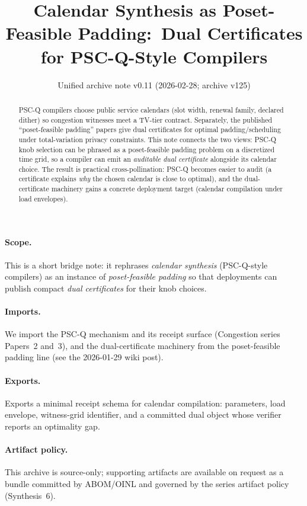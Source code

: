 \documentclass[11pt]{article}
\title{Calendar Synthesis as Poset-Feasible Padding:\ Dual Certificates for PSC-Q-Style Compilers}
\author{}
\date{Unified archive note v0.11 (2026-02-28; archive v125)}
\theoremstyle{definition}
\theoremstyle{remark}
\begin{document}
\maketitle

\begin{abstract}
PSC-Q compilers choose public service calendars (slot width, renewal family, declared dither) so congestion witnesses meet a TV-tier contract.
Separately, the published ``poset-feasible padding'' papers give dual certificates for optimal padding/scheduling under total-variation privacy constraints.
This note connects the two views: PSC-Q knob selection can be phrased as a poset-feasible padding problem on a discretized time grid,
so a compiler can emit an \emph{auditable dual certificate} alongside its calendar choice.
The result is practical cross-pollination: PSC-Q becomes easier to audit (a certificate explains \emph{why} the chosen calendar is close to optimal),
and the dual-certificate machinery gains a concrete deployment target (calendar compilation under load envelopes).
\end{abstract}
\paragraph{Scope.}
This is a short bridge note: it rephrases \emph{calendar synthesis} (PSC-Q-style compilers) as an instance of \emph{poset-feasible padding} so that deployments can publish compact \emph{dual certificates} for their knob choices.

\paragraph{Imports.}
We import the PSC-Q mechanism and its receipt surface (Congestion series Papers~2 and~3), and the dual-certificate machinery from the poset-feasible padding line (see the 2026-01-29 wiki post).\cite{series:pscq,series:wcongeq,series:knapsacktransport}

\paragraph{Exports.}
Exports a minimal receipt schema for calendar compilation: parameters, load envelope, witness-grid identifier, and a committed dual object whose verifier reports an optimality gap.

\paragraph{Artifact policy.}
This archive is source-only; supporting artifacts are available on request as a bundle committed by ABOM/OINL and governed by the series artifact policy (Synthesis~6).\cite{series:artifactpolicy}
\end{document}
